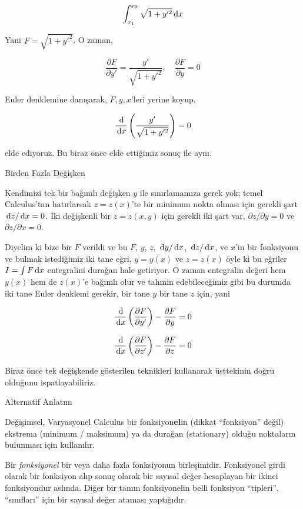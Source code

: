 \documentclass[12pt,fleqn]{article}\usepackage{../../common}
\begin{document}
$$
\int_{x_1}^{x_2} \sqrt{1 + y'^2} \,\mathrm{d} x
$$

Yani $F =  \sqrt{1 + {y'}^2}$. O zaman,

$$
\frac{\partial F}{\partial y'} = \frac{y'}{\sqrt{1 + y'^2}}, \quad
\frac{\partial F}{\partial y} = 0
$$

Euler denklemine danışarak, $F,y,x$'leri yerine koyup,

$$
\frac{\,\mathrm{d}}{\,\mathrm{d} x} \left(
  \frac{y'}{\sqrt{1 + y'^2}}
\right) = 0
$$

elde ediyoruz. Bu biraz önce elde ettiğimiz sonuç ile aynı. 

Birden Fazla Değişken

Kendimizi tek bir bağımlı değişken $y$ ile sınırlamamıza gerek yok; temel
Calculus'tan hatırlarsak $z = z(x)$'te bir minimum nokta olması için
gerekli şart $\,\mathrm{d} z / \,\mathrm{d} x = 0$. İki değişkenli bir $z = z(x,y)$ için
gerekli iki şart var, $\partial z / \partial y = 0$ ve
$\partial z / \partial x = 0$. 

Diyelim ki bize bir $F$ verildi ve bu $F$, $y$, $z$, $\,\mathrm{d} y / \,\mathrm{d} x$, $\,\mathrm{d} z /
\,\mathrm{d} x$, ve $x$'in bir fonksiyonu ve bulmak istediğimiz iki tane eğri,
$y=y(x)$ ve $z=z(x)$ öyle ki bu eğriler $I = \int F \,\mathrm{d} x$ entegralini
durağan hale getiriyor. O zaman entegralin değeri hem $y(x)$ hem de
$z(x)$'e bağımlı olur ve tahmin edebileceğimiz gibi bu durumda iki tane
Euler denklemi gerekir, bir tane $y$ bir tane $z$ için, yani

$$
\frac{\,\mathrm{d}}{\,\mathrm{d} x} 
  \left( \frac{\partial F}{\partial y'} \right) -
  \frac{\partial F}{\partial y} = 0
$$

$$
\frac{\,\mathrm{d}}{\,\mathrm{d} x} 
  \left( \frac{\partial F}{\partial z'} \right) -
  \frac{\partial F}{\partial z} = 0
$$

Biraz önce tek değişkende gösterilen teknikleri kullanarak üsttekinin doğru
olduğunu ispatlayabiliriz.  

\newpage

Alternatif Anlatım

Değişimsel, Varyasyonel Calculus bir fonksiyon\textbf{el}in (dikkat
``fonksiyon'' değil) ekstrema (minimum / maksimum) ya da durağan
(stationary) olduğu noktaların bulunması için kullanılır.

Bir {\em fonksiyonel} bir veya daha fazla fonksiyonun
birleşimidir. Fonksiyonel girdi olarak bir fonksiyon alıp sonuç olarak
bir sayısal değer hesaplayan bir ikinci fonksiyondur aslında. Diğer
bir tanım fonksiyonelin belli fonksiyon ``tipleri'', ``sınıfları''
için bir sayısal değer ataması yaptığıdır.
\end{document}
